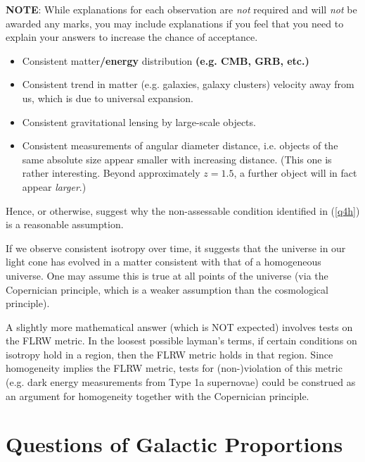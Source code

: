 \documentclass[a4paper,11pt]{exam}
\begin{document}
\begin{questions}
	\textbf{NOTE}: While explanations for each observation are \textit{not} required and will \textit{not} be awarded any marks, you may include explanations if you feel that you need to explain your answers to increase the chance of acceptance.
	\begin{solution}
		\begin{itemize}
			\item Consistent matter\textbf{/energy} distribution \textbf{(e.g. CMB, GRB, etc.)}
			\item Consistent trend in matter (e.g. galaxies, galaxy clusters) velocity away from us, which is due to universal expansion.
			\item Consistent gravitational lensing by large-scale objects.
			\item Consistent measurements of angular diameter distance, i.e. objects of the same absolute size appear smaller with increasing distance. (This one is rather interesting. Beyond approximately $z = 1.5$, a further object will in fact appear \textit{larger}.)
		\end{itemize}
	\end{solution}
	
\question[1]
	Hence, or otherwise, suggest why the non-assessable condition identified in (\ref{q4h}) is a reasonable assumption.
	\droppoints
	\begin{solution}
		If we observe consistent isotropy over time, it suggests that the universe in our light cone has evolved in a matter consistent with that of a homogeneous universe. One may assume this is true at all points of the universe (via the Copernician principle, which is a weaker assumption than the cosmological principle).
		
		A slightly more mathematical answer (which is NOT expected) involves tests on the FLRW metric. In the loosest possible layman's terms, if certain conditions on isotropy hold in a region, then the FLRW metric holds in that region. Since homogeneity implies the FLRW metric, tests for (non-)violation of this metric (e.g. dark energy measurements from Type 1a supernovae) could be construed as an argument for homogeneity together with the Copernician principle.
	\end{solution}
\end{questions}

\newpage
\section{Questions of Galactic Proportions}
\end{document}
